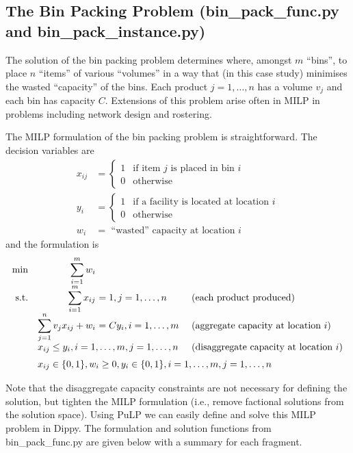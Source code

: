 \subsection{The Bin Packing Problem (bin\_pack\_func.py and bin\_pack\_instance.py)} \label{sbs:binpack}

The solution of the bin packing problem determines where, amongst $m$ ``bins'', to place $n$ ``items'' of various ``volumes'' in a way that (in this case study) minimises the wasted ``capacity'' of the bins. Each product $j=1, \ldots, n$ has a volume $v_j$ and each bin has capacity $C$. Extensions of this problem arise often in \ac{MILP} in problems including network design and rostering.

The \ac{MILP} formulation of the bin packing problem is straightforward. The decision variables are
\begin{align*}
x_{ij} &= \begin{cases} 1 & \text{if item $j$ is placed in bin $i$} \\
0 & \text{otherwise} \end{cases} \\
y_i &= \begin{cases} 1 & \text{if a facility is located at location $i$} \\
0 & \text{otherwise} \end{cases} \\
w_i &= \text{ ``wasted'' capacity at location $i$}
\end{align*}
and the formulation is
\[
\begin{array}{rr@{\ }ll}
       \min & \displaystyle \sum_{i=1}^m w_i \\
\text{s.t.} & \displaystyle \sum_{i=1}^m x_{ij}           & = 1, j = 1, \ldots, n      & \text{ (each product produced)} \\
            & \displaystyle \sum_{j=1}^n v_j x_{ij} + w_i & = C y_i, i = 1, \ldots, m  & \text{ (aggregate capacity at location $i$)} \\
            & \multicolumn{2}{l}{x_{ij} \leq y_i, i = 1, \ldots, m, j = 1, \ldots, n}  & \text{ (disaggregate capacity at location $i$)} \\[6pt]
            & \multicolumn{3}{l}{x_{ij} \in \{ 0, 1\}, w_i \geq 0, y_i \in \{0, 1\}, i = 1, \ldots, m, j = 1, \ldots, n}
\end{array}
\]

Note that the disaggregate capacity constraints are not necessary for defining the solution, but tighten the \ac{MILP} formulation (i.e., remove factional solutions from the solution space). Using PuLP we can easily define and solve this \ac{MILP} problem in Dippy. The formulation and solution functions from bin\_pack\_func.py are given below with a summary for each fragment.

